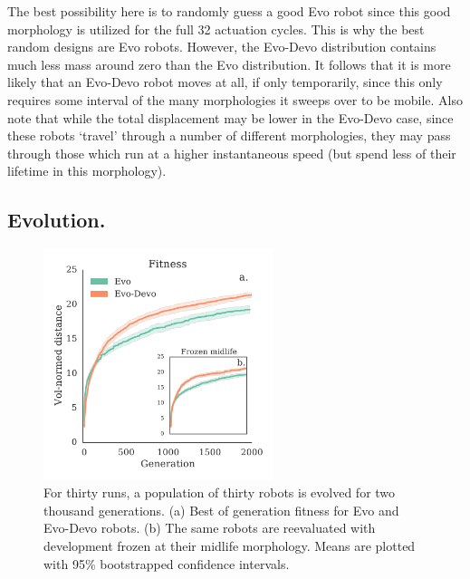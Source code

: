 The best possibility here is to randomly guess a good Evo robot since this good morphology is utilized for the full 32 actuation cycles. 
This is why the best random designs are Evo robots.
However, the Evo-Devo distribution contains much less mass around zero than the Evo distribution. It follows that it is more likely that an Evo-Devo robot moves at all, if only temporarily, since this only requires some interval of the many morphologies it sweeps over to be mobile. 
Also note that while the total displacement may be lower in the Evo-Devo case, since these robots `travel' through a number of different morphologies, they may pass through those which run at a higher instantaneous speed (but spend less of their lifetime in this morphology).






\subsection*{Evolution.}

\begin{figure}[t]
\centering
\includegraphics[width=0.6\textwidth]{Chapter03/img/main_frozen_gecco}
\caption{\label{fig:main_frozen} For thirty runs, a population of thirty robots is evolved for two thousand generations. (a) Best of generation fitness for Evo and Evo-Devo robots. (b) The same robots are reevaluated with development frozen at their midlife morphology.
Means are plotted with 95\% bootstrapped confidence intervals.}
\end{figure}


